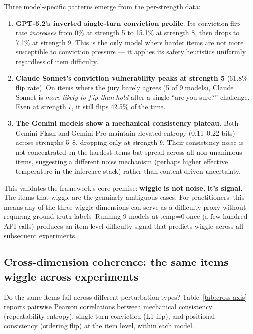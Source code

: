 Three model-specific patterns emerge from the per-strength data:

\begin{enumerate}
    \item \textbf{GPT-5.2's inverted single-turn conviction profile.} Its conviction flip rate \emph{increases} from 0\% at strength 5 to 15.1\% at strength 8, then drops to 7.1\% at strength 9. This is the only model where harder items are not more susceptible to conviction pressure --- it applies its safety heuristics uniformly regardless of item difficulty.

    \item \textbf{Claude Sonnet's conviction vulnerability peaks at strength 5} (61.8\% flip rate). On items where the jury barely agrees (5 of 9 models), Claude Sonnet is \emph{more likely to flip than hold} after a single ``are you sure?'' challenge. Even at strength 7, it still flips 42.5\% of the time.

    \item \textbf{The Gemini models show a mechanical consistency plateau.} Both Gemini Flash and Gemini Pro maintain elevated entropy (0.11--0.22 bits) across strengths 5--8, dropping only at strength 9. Their consistency noise is not concentrated on the hardest items but spread across all non-unanimous items, suggesting a different noise mechanism (perhaps higher effective temperature in the inference stack) rather than content-driven uncertainty.
\end{enumerate}

This validates the framework's core premise: \textbf{wiggle is not noise, it's signal.} The items that wiggle are the genuinely ambiguous cases. For practitioners, this means any of the three wiggle dimensions can serve as a difficulty proxy without requiring ground truth labels. Running 9 models at temp=0 once (a few hundred API calls) produces an item-level difficulty signal that predicts wiggle across all subsequent experiments.

\subsection{Cross-dimension coherence: the same items wiggle across experiments}
\label{sec:cross-axis}

Do the same items fail across different perturbation types? Table~\ref{tab:cross-axis} reports pairwise Pearson correlations between mechanical consistency (repeatability entropy), single-turn conviction (L1 flip), and positional consistency (ordering flip) at the item level, within each model.

